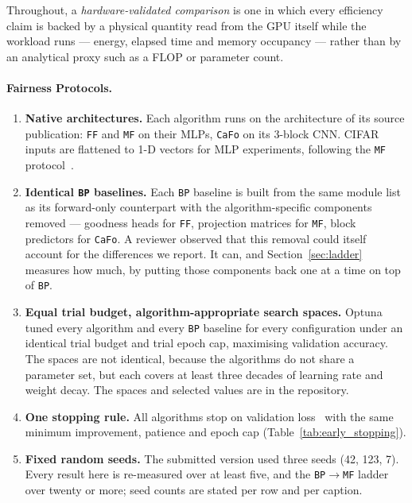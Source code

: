 \documentclass{llncs}
\newcommand{\FF}{\texttt{FF}}
\newcommand{\MF}{\texttt{MF}}
\newcommand{\BP}{\texttt{BP}}
\newcommand{\CaFo}{\texttt{CaFo}}
\begin{document}
Throughout, a \emph{hardware-validated comparison} is one in which every
efficiency claim is backed by a physical quantity read from the GPU itself
while the workload runs --- energy, elapsed time and memory occupancy ---
rather than by an analytical proxy such as a FLOP or parameter count.

\paragraph{Fairness Protocols.}
\begin{enumerate}
  \item \textbf{Native architectures.} Each algorithm runs on the
        architecture of its source publication: \FF{} and \MF{} on their
        MLPs, \CaFo{} on its 3-block CNN\@. CIFAR inputs are flattened to
        1-D vectors for MLP experiments, following the \MF{}
        protocol~\cite{gong2025mono}.
  \item \textbf{Identical \BP{} baselines.} Each \BP{} baseline is built
        from the same module list as its forward-only counterpart with the
        algorithm-specific components removed --- goodness heads for \FF{},
        projection matrices for \MF{}, block predictors for \CaFo{}. A
        reviewer observed that this removal could itself account for the
        differences we report. It can, and Section~\ref{sec:ladder} measures
        how much, by putting those components back one at a time on top of
        \BP{}.
  \item \textbf{Equal trial budget, algorithm-appropriate search spaces.}
        Optuna~\cite{akiba2019optuna} tuned every algorithm and every \BP{}
        baseline for every configuration under an identical trial budget and
        trial epoch cap, maximising validation accuracy. The spaces are not
        identical, because the algorithms do not share a parameter set, but
        each covers at least three decades of learning rate and weight decay.
        The spaces and selected values are in the repository.
  \item \textbf{One stopping rule.} All algorithms stop on validation
        loss~\cite{prechelt1998early} with the same minimum improvement,
        patience and epoch cap (Table~\ref{tab:early_stopping}).
  \item \textbf{Fixed random seeds.} The submitted version used three seeds
        (42, 123, 7). Every result here is re-measured over at least five,
        and the \BP{}$\to$\MF{} ladder over twenty or more; seed counts are
        stated per row and per caption.
\end{enumerate}
\end{document}
